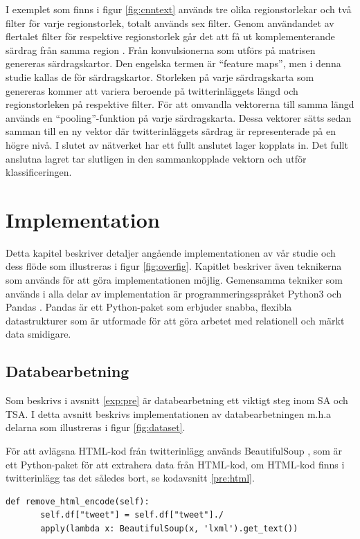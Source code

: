 \documentclass{kaumasters} %
\begin{document}
I exemplet som finns i figur \ref{fig:cnntext} används tre olika regionstorlekar och två filter för varje regionstorlek, totalt används sex filter. Genom användandet av flertalet filter för respektive regionstorlek går det att få ut komplementerande särdrag från samma region \cite{cnn:002}. Från konvulsionerna som utförs på matrisen genereras särdragskartor. Den engelska termen är “feature maps”, men i denna studie kallas de för särdragskartor. Storleken på varje särdragskarta som genereras kommer att variera beroende på twitterinläggets längd och regionstorleken på respektive filter. För att omvandla vektorerna till samma längd används en “pooling”-funktion på varje särdragskarta. Dessa vektorer sätts sedan samman till en ny vektor där twitterinläggets särdrag är representerade på en högre nivå. I slutet av nätverket har ett fullt anslutet lager kopplats in. Det fullt anslutna lagret tar slutligen in den sammankopplade vektorn och utför klassificeringen.



\section{Implementation}\label{impl}
Detta kapitel beskriver detaljer angående implementationen av vår studie och dess flöde som illustreras i figur \ref{fig:overfig}. Kapitlet beskriver även teknikerna som används för att göra implementationen möjlig. Gemensamma tekniker som används i alla delar av implementation är programmeringsspråket Python3 \cite{impl:001} och Pandas \cite{impl:002}. Pandas är ett Python-paket som erbjuder snabba, flexibla datastrukturer som är utformade för att göra arbetet med relationell och märkt data smidigare. 
\subsection{Databearbetning}\label{impl:pre}
Som beskrivs i avsnitt \ref{exp:pre} är databearbetning ett viktigt steg inom SA och TSA. I detta avsnitt beskrivs implementationen av databearbetningen m.h.a delarna som illustreras i figur \ref{fig:dataset}.

För att avlägsna HTML-kod från twitterinlägg används BeautifulSoup \cite{impl:004}, som är ett Python-paket för att extrahera data från HTML-kod, om HTML-kod finns i twitterinlägg tas det således bort, se kodavsnitt \ref{pre:html}.
\begin{lstlisting}[style=mypython,caption={Funktion för att avlägsna HTML-kod.},label=pre:html]
def remove_html_encode(self):
       self.df["tweet"] = self.df["tweet"]./
       apply(lambda x: BeautifulSoup(x, 'lxml').get_text())
\end{lstlisting}
\end{document}
